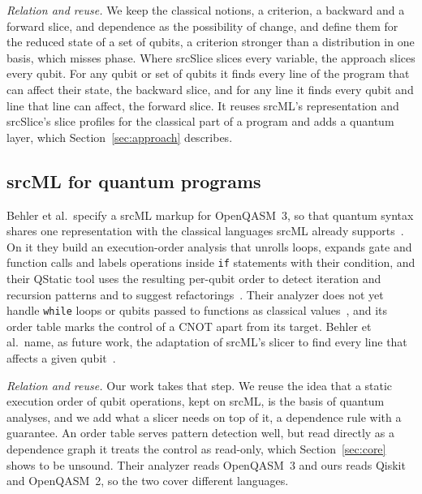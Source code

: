 \emph{Relation and reuse.} We keep the classical notions, a criterion, a backward and a forward slice, and
dependence as the possibility of change, and define them for the reduced state of a set of qubits, a criterion
stronger than a distribution in one basis, which misses phase. Where srcSlice slices every variable, the \tool{}
approach slices every qubit. For any qubit or set of qubits it finds every line of the program that can affect
their state, the backward slice, and for any line it finds every qubit and line that line can affect, the forward
slice. It reuses srcML's representation and srcSlice's slice profiles for the classical part of a program and
adds a quantum layer, which Section~\ref{sec:approach} describes.

\subsection{srcML for quantum programs}
Behler et al.\ specify a srcML markup for OpenQASM~3, so that quantum syntax shares one representation with the
classical languages srcML already supports~\cite{behler2024supporting}. On it they build an execution-order
analysis that unrolls loops, expands gate and function calls and labels operations inside \texttt{if}
statements with their condition, and their QStatic tool uses the resulting per-qubit order to detect
iteration and recursion patterns and to suggest refactorings~\cite{behler2025static}. Their analyzer does not
yet handle \texttt{while} loops or qubits passed to functions as classical values~\cite{behler2024supporting},
and its order table marks the control of a CNOT apart from its target. Behler et al.\ name, as future work, the
adaptation of srcML's slicer to find every line that affects a given qubit~\cite{behler2025static}.

\emph{Relation and reuse.} Our work takes that step. We reuse the idea that a static execution order of
qubit operations, kept on srcML, is the basis of quantum analyses, and we add what a slicer needs on top of it,
a dependence rule with a guarantee. An order table serves pattern detection well, but read directly as a
dependence graph it treats the control as read-only, which Section~\ref{sec:core} shows to be unsound. Their
analyzer reads OpenQASM~3 and ours reads Qiskit and OpenQASM~2, so the two cover different languages.

